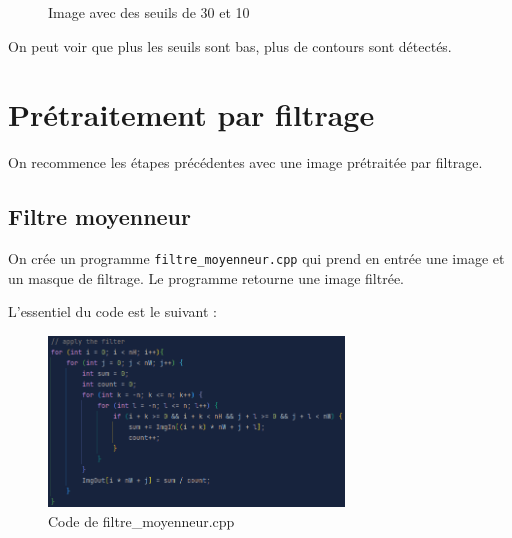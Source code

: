 \documentclass[french,a4paper,10pt]{article}
\begin{document}
\begin{figure}[!htb]
\begin{minipage}{0.3\textwidth}
        \end{minipage}\hfill
        \begin{minipage}{0.3\textwidth}
            \centering
            \caption{Image avec des seuils de 30 et 10}\label{Fig:hysteresis-30-10-peppers-grey}
        \end{minipage}
    \end{figure}

    On peut voir que plus les seuils sont bas, plus de contours sont détectés.

    \newpage
    \section{Prétraitement par filtrage}\label{sec:4}

    On recommence les étapes précédentes avec une image prétraitée par filtrage.

    \subsection{Filtre moyenneur}\label{subsec:4.1}

    On crée un programme \texttt{filtre\_moyenneur.cpp} qui prend en entrée une image et un masque de filtrage.
    Le programme retourne une image filtrée.

    L'essentiel du code est le suivant : %
    \begin{figure}[!htb]
        \centering
        \includegraphics[width=0.7\textwidth]{out/code-filtre-moyenneur}
        \caption{Code de filtre\_moyenneur.cpp}\label{fig:code-filtre-moyenneur}
    \end{figure}
\end{document}
